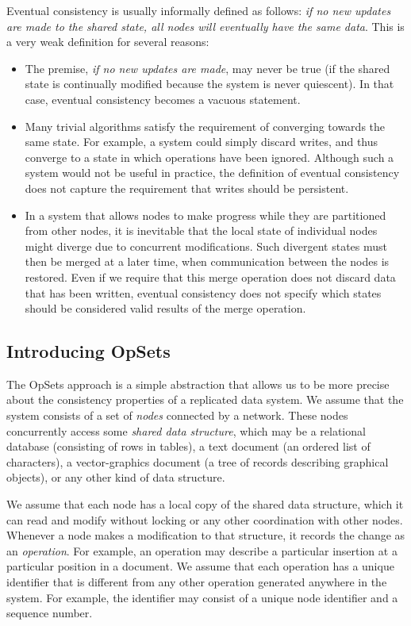 Eventual consistency is usually informally defined as follows: \emph{if no new updates are made to the shared state, all nodes will eventually have the same data}.
This is a very weak definition for several reasons:
\begin{itemize}
\item The premise, \emph{if no new updates are made}, may never be true (if the shared state is continually modified because the system is never quiescent).
In that case, eventual consistency becomes a vacuous statement.

\item Many trivial algorithms satisfy the requirement of converging towards the same state.
For example, a system could simply discard writes, and thus converge to a state in which operations have been ignored.
Although such a system would not be useful in practice, the definition of eventual consistency does not capture the requirement that writes should be persistent.

\item In a system that allows nodes to make progress while they are partitioned from other nodes, it is inevitable that the local state of individual nodes might diverge due to concurrent modifications.
Such divergent states must then be merged at a later time, when communication between the nodes is restored.
Even if we require that this merge operation does not discard data that has been written, eventual consistency does not specify which states should be considered valid results of the merge operation.
\end{itemize}

\subsection{Introducing OpSets}\label{sec:opsets-intro}

The OpSets approach is a simple abstraction that allows us to be more precise about the consistency properties of a replicated data system.
We assume that the system consists of a set of \emph{nodes} connected by a network.
These nodes concurrently access some \emph{shared data structure}, which may be a relational database (consisting of rows in tables), a text document (an ordered list of characters), a vector-graphics document (a tree of records describing graphical objects), or any other kind of data structure.

We assume that each node has a local copy of the shared data structure, which it can read and modify without locking or any other coordination with other nodes.
Whenever a node makes a modification to that structure, it records the change as an \emph{operation}.
For example, an operation may describe a particular insertion at a particular position in a document.
We assume that each operation has a unique identifier that is different from any other operation generated anywhere in the system.
For example, the identifier may consist of a unique node identifier and a sequence number.

